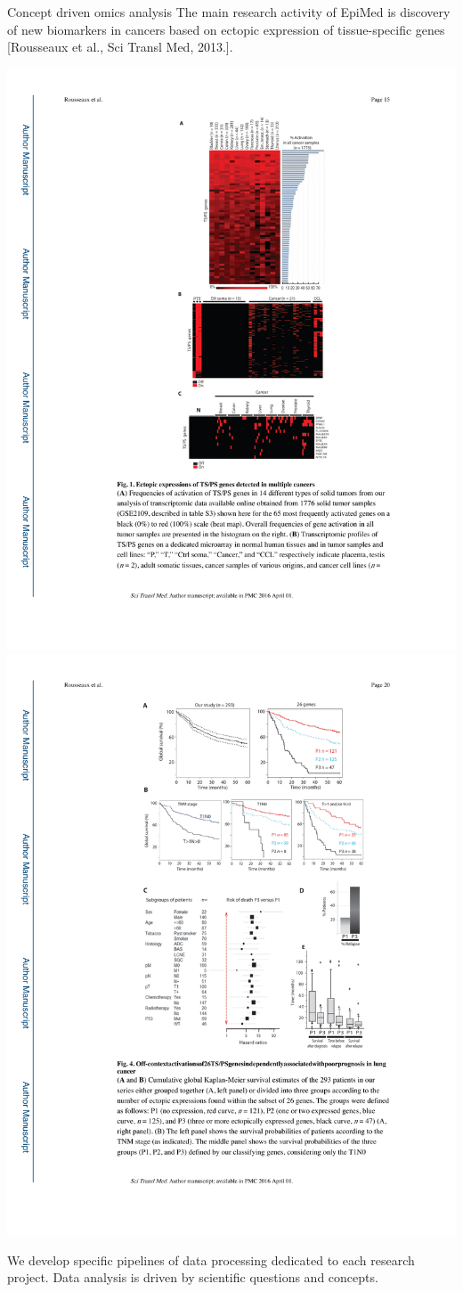 \documentclass[final]{beamer}
\newlength{\twocolwid}
\begin{document}
\begin{frame}[t]
\begin{columns}[t]
\begin{column}{\twocolwid}
\begin{block}{Concept driven omics analysis}
The main research activity of EpiMed is discovery of new biomarkers in cancers based on ectopic expression of tissue-specific genes [Rousseaux et al., Sci Transl Med, 2013.].

{
\centering
\mbox{\includegraphics[trim = 85mm 125mm 60mm 107mm, clip, width=.58\linewidth]{figs/fig01}}
\mbox{\includegraphics[trim = 120mm 212mm 50mm 20mm, clip, width=.4\linewidth]{figs/fig02}}
}



We develop specific pipelines of data processing dedicated to each research project. Data analysis is driven by scientific questions and concepts.




\end{block}
\end{column}
\end{columns}
\end{frame}
\end{document}
